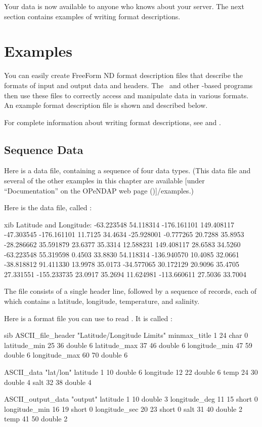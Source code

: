 Your data is now available to anyone who knows about your server.
The next section contains examples of writing format descriptions.

\section{Examples}

You can easily create FreeForm ND format description files that
describe the formats of input and output data and headers. The \ffs\ 
and other \ffnd -based programs then use these files to correctly
access and manipulate data in various formats. An example format
description file is shown and described below.

For complete information about writing format descriptions, see
 and .

\subsection{Sequence Data}

Here is a data file, containing a sequence of four data types.  (This
data file and several of the other examples in this chapter are
available [under ``Documentation'' on the OPeNDAP web page
(\DODShomeUrl)]{\DODShomeUrl/examples}.)

Here is the data file, called
:

\begin{vcode}{xib}
Latitude and Longitude:   -63.223548 54.118314  -176.161101 149.408117
-47.303545 -176.161101 11.7125 34.4634
-25.928001   -0.777265 20.7288 35.8953
-28.286662   35.591879 23.6377 35.3314
 12.588231  149.408117 28.6583 34.5260
-63.223548   55.319598  0.4503 33.8830
 54.118314 -136.940570 10.4085 32.0661
-38.818812   91.411330 13.9978 35.0173
-34.577065   30.172129 20.9096 35.4705
 27.331551 -155.233735 23.0917 35.2694
 11.624981 -113.660611 27.5036 33.7004
\end{vcode}

The file consists of a single header line, followed by a sequence of
records, each of which contains a latitude, longitude, temperature,
and salinity.

Here is a format file you can use to read .  It is
called \xlink{\lit{ffsimple.fmt}}{\DODShomeUrl/examples/ffsimple.fmt}:

\begin{vcode}{sib}
ASCII_file_header "Latitude/Longitude Limits"
minmax_title 1 24 char 0
latitude_min 25 36 double 6
latitude_max 37 46 double 6
longitude_min 47 59 double 6
longitude_max 60 70 double 6

ASCII_data "lat/lon"
latitude 1 10 double 6
longitude 12 22 double 6
temp 24 30 double 4
salt 32 38 double 4

ASCII_output_data "output"
latitude 1 10 double 3
longitude_deg 11 15 short 0
longitude_min 16 19 short 0
longitude_sec 20 23 short 0
salt 31 40 double 2
temp 41 50 double 2
\end{vcode}


